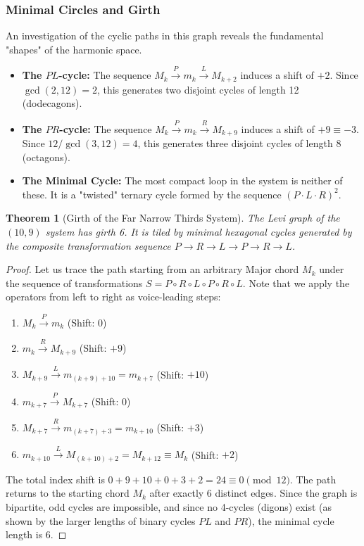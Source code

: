 \documentclass[12pt,letterpaper]{amsart}
\newtheorem{theorem}{Theorem}
\begin{document}
\subsubsection{Minimal Circles and Girth}
An investigation of the cyclic paths in this graph reveals the fundamental "shapes" of the harmonic space.

\begin{itemize}
    \item \textbf{The $PL$-cycle:} The sequence $M_k \xrightarrow{P} m_k \xrightarrow{L} M_{k+2}$ induces a shift of $+2$. Since $\gcd(2, 12)=2$, this generates two disjoint cycles of length 12 (dodecagons).
    \item \textbf{The $PR$-cycle:} The sequence $M_k \xrightarrow{P} m_k \xrightarrow{R} M_{k+9}$ induces a shift of $+9 \equiv -3$. Since $12/\gcd(3,12)=4$, this generates three disjoint cycles of length 8 (octagons).
    \item \textbf{The Minimal Cycle:} The most compact loop in the system is neither of these. It is a "twisted" ternary cycle formed by the sequence $(P \cdot L \cdot R)^2$.
\end{itemize}

\begin{theorem}[Girth of the Far Narrow Thirds System]
The Levi graph of the $(10,9)$ system has girth 6. It is tiled by minimal hexagonal cycles generated by the composite transformation sequence $P \to R \to L \to P \to R \to L$.
\end{theorem}

\begin{proof}
Let us trace the path starting from an arbitrary Major chord $M_k$ under the sequence of transformations $S = P \circ R \circ L \circ P \circ R \circ L$. Note that we apply the operators from left to right as voice-leading steps:
\begin{enumerate}
    \item $M_k \xrightarrow{P} m_k$ (Shift: $0$)
    \item $m_k \xrightarrow{R} M_{k+9}$ (Shift: $+9$)
    \item $M_{k+9} \xrightarrow{L} m_{(k+9)+10} = m_{k+7}$ (Shift: $+10$)
    \item $m_{k+7} \xrightarrow{P} M_{k+7}$ (Shift: $0$)
    \item $M_{k+7} \xrightarrow{R} m_{(k+7)+3} = m_{k+10}$ (Shift: $+3$)
    \item $m_{k+10} \xrightarrow{L} M_{(k+10)+2} = M_{k+12} \equiv M_k$ (Shift: $+2$)
\end{enumerate}
The total index shift is $0 + 9 + 10 + 0 + 3 + 2 = 24 \equiv 0 \pmod{12}$. The path returns to the starting chord $M_k$ after exactly 6 distinct edges. Since the graph is bipartite, odd cycles are impossible, and since no 4-cycles (digons) exist (as shown by the larger lengths of binary cycles $PL$ and $PR$), the minimal cycle length is 6.
\end{proof}
\end{document}
